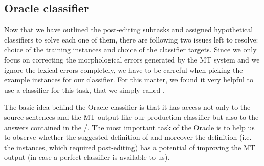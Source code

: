 \subsection{Oracle classifier}

Now that we have outlined the post-editing subtasks and assigned hypothetical classifiers 
to solve each one of them, there are following two issues left to resolve: choice of the
training instances and choice of the classifier targets. Since we only focus on correcting the morphological
errors generated by the MT system and we ignore the lexical errors completely, we have to be carreful
when picking the example instances for our classifier. For this matter, we found it very helpful to
use a  classifier for this task, that we simply called .

The basic idea behind the Oracle classifier is that it has access not only to the
source sentences and the MT output like our production classifier but also to the  answers
contained in the /. The most important
task of the Oracle is to help us to observe whether the suggested definition of  and
moreover the definition  (i.e. the instances, which required post-editing)
has a potential of improving the MT output (in case a perfect classifier is available to us).

